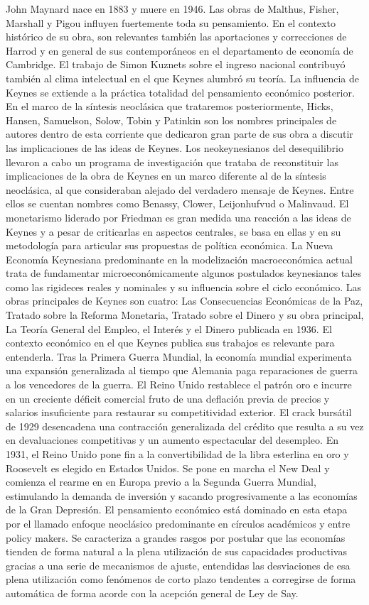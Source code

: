 \documentclass{nuevotema}
\begin{document}
John Maynard  nace en 1883 y muere en 1946. Las obras de Malthus, Fisher, Marshall y Pigou influyen fuertemente toda su pensamiento. En el contexto histórico de su obra, son relevantes también las aportaciones y correcciones de Harrod y en general de sus contemporáneos en el departamento de economía de Cambridge. El trabajo de Simon Kuznets sobre el ingreso nacional contribuyó también al clima intelectual en el que Keynes alumbró su teoría. La influencia de Keynes se extiende a la práctica totalidad del pensamiento económico posterior. En el marco de la síntesis neoclásica que trataremos posteriormente, Hicks, Hansen, Samuelson, Solow, Tobin y Patinkin son los nombres principales de autores dentro de esta corriente que dedicaron gran parte de sus obra a discutir las implicaciones de las ideas de Keynes. Los neokeynesianos del desequilibrio llevaron a cabo un programa de investigación que trataba de reconstituir las implicaciones de la obra de Keynes en un marco diferente al de la síntesis neoclásica, al que consideraban alejado del verdadero mensaje de Keynes. Entre ellos se cuentan nombres como Benassy, Clower, Leijonhufvud o Malinvaud. El monetarismo liderado por Friedman es gran medida una reacción a las ideas de Keynes y a pesar de criticarlas en aspectos centrales, se basa en ellas y en su metodología para articular sus propuestas de política económica. La Nueva Economía Keynesiana predominante en la modelización macroeconómica actual trata de fundamentar microeconómicamente algunos postulados keynesianos tales como las rigideces reales y nominales y su influencia sobre el ciclo económico. Las obras principales de Keynes son cuatro: Las Consecuencias Económicas de la Paz, Tratado sobre la Reforma Monetaria, Tratado sobre el Dinero y su obra principal, La Teoría General del Empleo, el Interés y el Dinero publicada en 1936. El contexto económico en el que Keynes publica sus trabajos es relevante para entenderla. Tras la Primera Guerra Mundial, la economía mundial experimenta una expansión generalizada al tiempo que Alemania paga reparaciones de guerra a los vencedores de la guerra. El Reino Unido restablece el patrón oro e incurre en un creciente déficit comercial fruto de una deflación previa de precios y salarios insuficiente para restaurar su competitividad exterior. El crack bursátil de 1929 desencadena una contracción generalizada del crédito que resulta a su vez en devaluaciones competitivas y un aumento espectacular del desempleo. En 1931, el Reino Unido pone fin a la convertibilidad de la libra esterlina en oro y Roosevelt es elegido en Estados Unidos. Se pone en marcha el New Deal y comienza el rearme en en Europa previo a la Segunda Guerra Mundial, estimulando la demanda de inversión y sacando progresivamente a las economías de la Gran Depresión. El pensamiento económico está dominado en esta etapa por el llamado enfoque neoclásico predominante en círculos académicos y entre policy makers. Se caracteriza a grandes rasgos por postular que las economías tienden de forma natural a la plena utilización de sus capacidades productivas gracias a una serie de mecanismos de ajuste, entendidas las desviaciones de esa plena utilización como fenómenos de corto plazo tendentes a corregirse de forma automática de forma acorde con la acepción general de Ley de Say.
\end{document}
